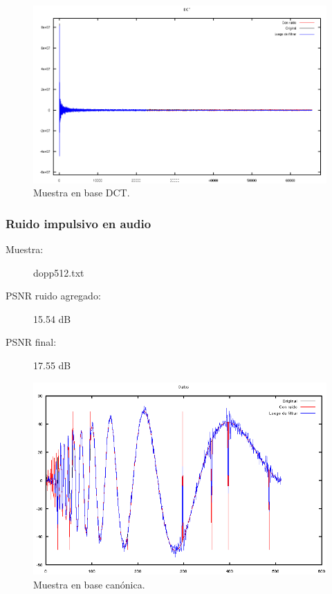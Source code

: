 \documentclass[a4paper,10pt,twoside]{article}
\begin{document}
\begin{figure}[H]
  \centering
  \includegraphics[width=15cm]{graficos/lena_aditivo_atenuar_dct.png} 
  \caption{Muestra en base DCT.}
\end{figure}


\subsubsection{Ruido impulsivo en audio}

\begin{description}
  \item[Muestra:] dopp512.txt
  \item[PSNR ruido agregado:] 15.54 dB
  \item[PSNR final:] 17.55 dB
\end{description}

\begin{figure}[H]
  \centering
  \includegraphics[width=15cm]{graficos/dopp_impulsivo_atenuar_muestra.png} 
  \caption{Muestra en base canónica.}
\end{figure}
\end{document}
